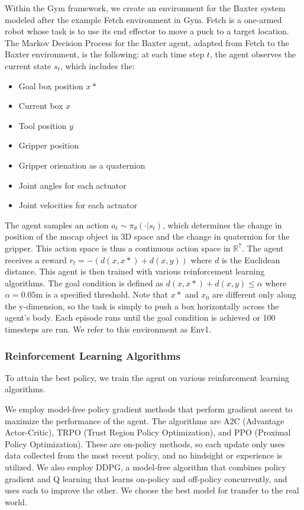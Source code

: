 \documentclass[conference]{IEEEtran}
\begin{document}
Within the Gym framework, we create an environment for the Baxter system modeled after the example Fetch environment in Gym. Fetch is a one-armed robot whose task is to use its end effector to move a puck to a target location. The Markov Decision Process for the Baxter agent, adapted from Fetch to the Baxter environment, is the following: at each time step $t$, the agent observes the current state $s_t$, which includes the:
\vspace{1mm}
\begin{itemize}
 \item Goal box position $x*$
 \item Current box $x$
 \item Tool position $y$
 \item Gripper position
 \item Gripper orienation as a quaternion
 \item Joint angles for each actuator
 \item Joint velocities for each actuator
\end{itemize}
\vspace{1mm}
The agent samples an action $a_t \sim \pi_\theta(\cdot|s_t)$, which determines the change in position of the mocap object in 3D space and the change in quaternion for the gripper. This action space is thus a continuous action space in $\mathbb{R}^7$. The agent receives a reward $r_t = - (d(x,x*) + d(x, y))$ where $d$ is the Euclidean distance. This agent is then trained with various reinforcement learning algorithms. The goal condition is defined as $d(x,x*) + d(x,y) \leq \alpha$ where $\alpha = 0.05$m is a specified threshold. Note that $x*$ and $x_0$ are different only along the y-dimension, so the task is simply to push a box horizontally across the agent's body. Each episode runs until the goal condition is achieved or 100 timesteps are run. We refer to this environment as Env1.

\vspace{2mm}
\subsubsection{Reinforcement Learning Algorithms}
To attain the best policy, we train the agent on various reinforcement learning algorithms. 

We employ model-free policy gradient methods that perform gradient ascent to maximize the performance of the agent. The algorithms are A2C (Advantage Actor-Critic)\cite{a2c}, TRPO (Trust Region Policy Optimization)\cite{trpo}, and PPO (Proximal Policy Optimization)\cite{ppo}. These are on-policy methods, so each update only uses data collected from the most recent policy, and no hindsight or experience is utilized. We also employ DDPG, a model-free algorithm that combines policy gradient and Q learning that learns on-policy and off-policy concurrently, and uses each to improve the other. We choose the best model for transfer to the real world.
\end{document}
